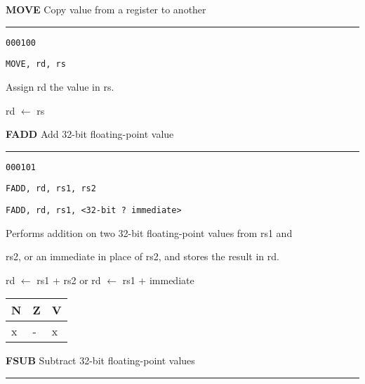 \documentclass{article}
\begin{document}
\bigskip\bigskip

\flushleft
\LARGE\textbf{MOVE} \large \hfill Copy value from a register to another

\kern-3pt
\noindent\rule{16.5cm}{0.4pt}
\normalsize

{\large
	 \texttt{000100} \par
	\smallbreak
	 \texttt{MOVE, rd, rs} \par
	\smallbreak
	 Assign rd the value in rs. \par
	\smallbreak
	 rd $\leftarrow$ rs \par
}

\pagebreak

\flushleft
\LARGE\textbf{FADD} \large \hfill Add 32-bit floating-point value

\kern-3pt
\noindent\rule{16.5cm}{0.4pt}
\normalsize

{\large
	 \texttt{000101} \par
	\smallbreak
	 \texttt{FADD, rd, rs1, rs2} \par
	\smallbreak
	 \texttt{FADD, rd, rs1, <32-bit ? immediate>} \par
	\smallbreak
	 Performs addition on two 32-bit floating-point values from rs1 and \par
	\makebox[3.5cm][l]{  } rs2, or an immediate in place of rs2, and stores the result in rd. \par
	\smallbreak
	 rd $\leftarrow$ rs1 + rs2 \quad or \quad rd $\leftarrow$ rs1 + immediate\par
	\smallbreak
	 \begin{tabular}{lll} N \quad & Z \quad & V \\ \hline x & - & x \\ \end{tabular}
}

\bigskip\bigskip

\flushleft
\LARGE\textbf{FSUB} \large \hfill Subtract 32-bit floating-point values

\kern-3pt
\noindent\rule{16.5cm}{0.4pt}
\normalsize
\end{document}
